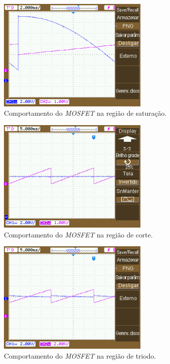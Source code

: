 \documentclass{article}
\begin{document}
\begin{figure}[h!]
    \centering
    \includegraphics[height=5.5cm]{imgSource/mosfet_sat.png}
    \caption{Comportamento do \emph{MOSFET} na região de saturação.}
    \label{fig:mos_sat_osc}
\end{figure}

\begin{figure}[h!]
    \centering
    \includegraphics[height=5.5cm]{imgSource/mosfet_corte.png}
    \caption{Comportamento do \emph{MOSFET} na região de corte.}
    \label{fig:mos_corte_osc}
\end{figure}

\begin{figure}[h!]
    \centering
    \includegraphics[height=5.5cm]{imgSource/mosfet_tri.png}
    \caption{Comportamento do \emph{MOSFET} na região de triodo.}
    \label{fig:mos_tri_osc}
\end{figure}
\end{document}
